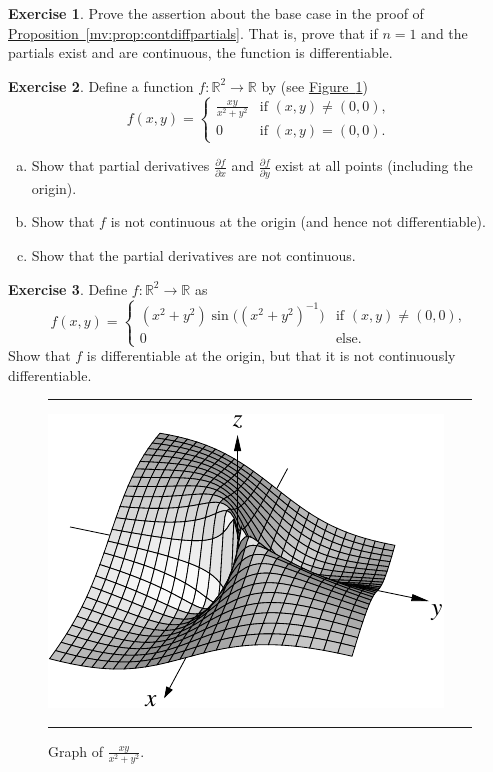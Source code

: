 \documentclass[12pt,openany]{book}
\newcommand{\R}{{\mathbb{R}}}
\theoremstyle{plain}
\theoremstyle{remark}
\theoremstyle{definition}
\newenvironment{exbox}{%
    \def\FrameCommand{\vrule width 1pt \relax\hspace {10pt}}%
    \MakeFramed {\advance \hsize -\width \FrameRestore }%
}{%
    \endMakeFramed
}
\newenvironment{exparts}{%
    \leavevmode\begin{enumerate}[a),noitemsep,topsep=0pt,parsep=0pt,partopsep=0pt]
}{%
    \end{enumerate}
}
\newenvironment{myfig}{%
\begin{figure}[h!t]
\noindent\rule{\textwidth}{0.4pt}\vspace{12pt}\par\centering}%
{\par\noindent\rule{\textwidth}{0.4pt}
\end{figure}}
\theoremstyle{exercise}
\newtheorem{exercise}{Exercise}[section]
\theoremstyle{example}
\newcommand{\figureref}[1]{\hyperref[#1]{Figure~\ref*{#1}}}
\newcommand{\propref}[1]{\hyperref[#1]{Proposition~\ref*{#1}}}
\begin{document}
\begin{exbox}
\begin{exercise}
Prove the assertion about the base case
in the proof of \propref{mv:prop:contdiffpartials}.  That is, prove that
if $n=1$ and 
the partials exist and are continuous, the function is 
differentiable.
\end{exercise}

\begin{exercise} \label{exercise:noncontpartialsexist}
Define a function $f \colon \R^2 \to \R$ by
(see \figureref{fig:xyxsqysqvol2})
\begin{equation*}
f(x,y)
=
\begin{cases}
\frac{xy}{x^2+y^2} & \text{if } (x,y) \not= (0,0), \\
0 & \text{if } (x,y) = (0,0).
\end{cases}
\end{equation*}
\begin{exparts}
\item
Show that partial derivatives 
$\frac{\partial f}{\partial x}$ and
$\frac{\partial f}{\partial y}$ exist at all points (including the origin).
\item
Show that $f$ is not continuous at the origin (and hence not
differentiable).
\item
Show that the partial derivatives are not continuous.
\end{exparts}
\end{exercise}

\begin{exercise}
Define $f \colon \R^2 \to \R$ as
\begin{equation*}
f(x,y) =
\begin{cases}
(x^2+y^2)\sin\bigl({(x^2+y^2)}^{-1}\bigr) & \text{if } (x,y) \not= (0,0), \\
0 & \text{else.}
\end{cases}
\end{equation*}
Show that $f$ is differentiable at the origin, but that it is not 
continuously differentiable.
\end{exercise}
\end{exbox}

\begin{myfig}
\includegraphics{figures/xyxsqysq}
\caption{Graph of $\frac{xy}{x^2+y^2}$.\label{fig:xyxsqysqvol2}}
\end{myfig}
\end{document}
